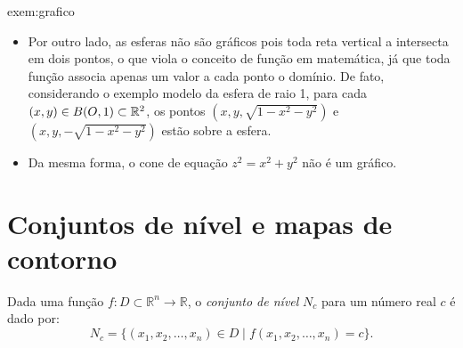 \begin{example}{}{exem:grafico}
\begin{itemize}[label=\color{examplescolor}\textbullet]
\begin{center}
\end{center}



\end{itemize}

    


\begin{itemize}[label=\color{examplescolor}\textbullet]

\item Por outro lado, as esferas não são gráficos pois toda reta vertical a intersecta em dois pontos, o que viola o conceito de função em matemática, já que toda função associa apenas um valor a cada ponto o domínio. De fato, considerando o exemplo modelo da esfera de raio 1, para cada $(x,y)\in B(O,1)\subset \mathbb{R}^2$, os pontos $(x,y,\sqrt{1-x^2-y^2})$ e $(x,y,-\sqrt{1-x^2-y^2})$ estão sobre a esfera. 

\item Da mesma forma, o cone de equação $z^2 = x^2 + y^2$ não é um gráfico. 

\end{itemize}


\end{example}




\section{Conjuntos de nível e mapas de contorno}

\begin{definition}{}{}
Dada uma função \( f: D \subset \mathbb{R}^n \rightarrow \mathbb{R} \), o \textit{conjunto de nível} \( N_c \) para um número real \( c \) é dado por:
\[ N_c = \{(x_1, x_2, \ldots, x_n) \in D \mid f(x_1, x_2, \ldots, x_n) = c \}.\]
\end{definition}

